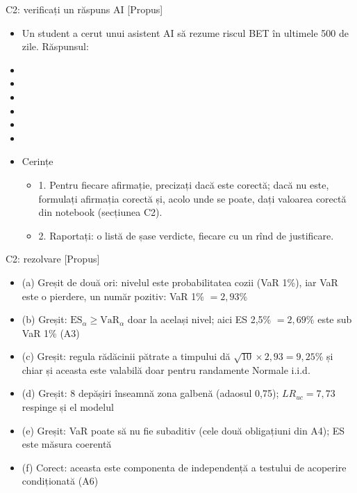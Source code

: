 \begin{frame}{C2: verificați un răspuns AI [Propus]}
\itemsize{\scriptsize}
\begin{itemize}
    \item Un student a cerut unui asistent AI să rezume riscul BET în ultimele 500 de zile. Răspunsul:
    \item {}
    \item {}
    \item {}
    \item {}
    \item {}
    \item {}
    \item Cerințe
    \begin{itemize}
        \item 1. Pentru fiecare afirmație, precizați dacă este corectă; dacă nu este, formulați afirmația corectă și, acolo unde se poate, dați valoarea corectă din notebook (secțiunea C2).
        \item 2. Raportați: o listă de șase verdicte, fiecare cu un rînd de justificare.
    \end{itemize}
\end{itemize}
\end{frame}

\ifsolutions
\begin{frame}{C2: rezolvare [Propus]}
\itemsize{\footnotesize}
\begin{itemize}
    \item (a) Greșit de două ori: nivelul este probabilitatea cozii (VaR 1\%), iar VaR este o pierdere, un număr pozitiv: VaR 1\% $= 2{,}93\%$
    \item (b) Greșit: $\mathrm{ES}_\alpha \ge \mathrm{VaR}_\alpha$ doar la același nivel; aici ES 2,5\% $= 2{,}69\%$ este sub VaR 1\% (A3)
    \item (c) Greșit: regula rădăcinii pătrate a timpului dă $\sqrt{10} \times 2{,}93 = 9{,}25\%$ și chiar și aceasta este valabilă doar pentru randamente Normale i.i.d.
    \item (d) Greșit: 8 depășiri înseamnă zona galbenă (adaosul 0,75); $LR_{uc} = 7{,}73$ respinge și el modelul
    \item (e) Greșit: VaR poate să nu fie subaditiv (cele două obligațiuni din A4); ES este măsura coerentă
    \item (f) Corect: aceasta este componenta de independență a testului de acoperire condiționată (A6)
\end{itemize}
\end{frame}
\fi


